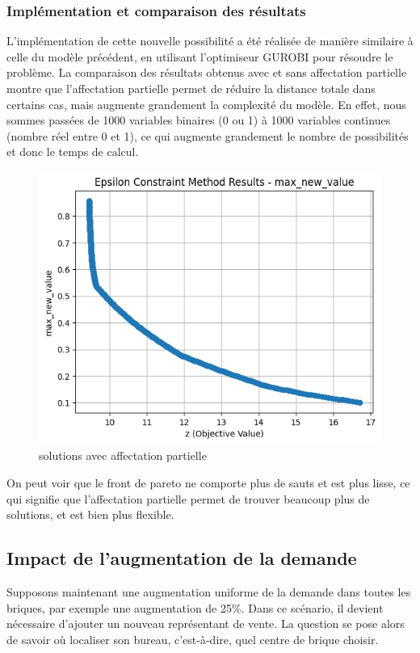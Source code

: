 \subsubsection{Implémentation et comparaison des résultats}
L'implémentation de cette nouvelle possibilité a été réalisée de manière similaire à celle du modèle précédent, en utilisant l'optimiseur GUROBI pour résoudre le problème. La comparaison des résultats obtenus avec et sans affectation partielle montre que l'affectation partielle permet de réduire la distance totale dans certains cas, mais augmente grandement la complexité du modèle.
En effet, nous sommes passées de 1000 variables binaires (0 ou 1) à 1000 variables continues (nombre réel entre 0 et 1), ce qui augmente grandement le nombre de possibilités et donc le temps de calcul.


\begin{figure}[H]
    \centering
    \includegraphics[width=\textwidth]{Images/step_2/step_2-new-representative-location.png}
    \caption{solutions avec affectation partielle}
    \label{fig:new_SR_location}
\end{figure}

On peut voir que le front de pareto ne comporte plus de sauts et est plus lisse, ce qui signifie que l'affectation partielle permet de trouver beaucoup plus de solutions, et est bien plus flexible.

\subsection{Impact de l'augmentation de la demande}
Supposons maintenant une augmentation uniforme de la demande dans toutes les briques, par exemple une augmentation de 25\%. Dans ce scénario, il devient nécessaire d'ajouter un nouveau représentant de vente. La question se pose alors de savoir où localiser son bureau, c'est-à-dire, quel centre de brique choisir.

